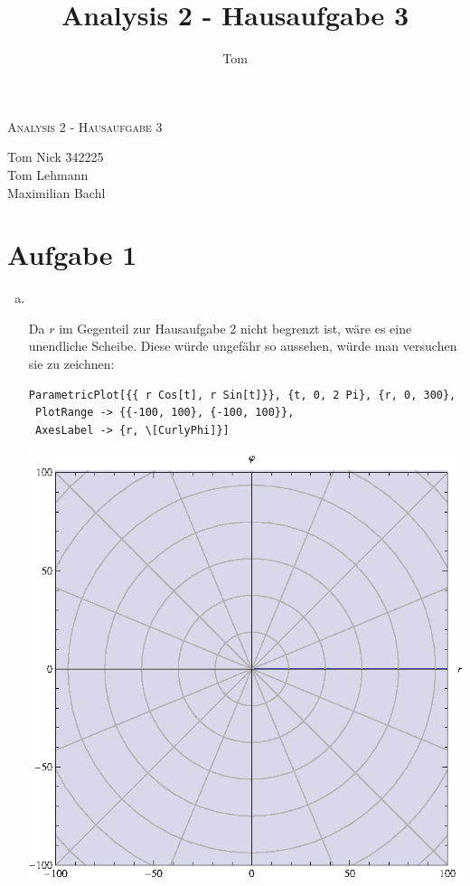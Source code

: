 \documentclass[10pt,a4paper,parskip=half]{scrartcl}
\author{Tom}
\title{Analysis 2 - Hausaufgabe 3}
\begin{document}
\begin{center}
\textsc{\Large{Analysis 2 - Hausaufgabe 3}} \\
\end{center}
\begin{tabbing}
Tom Nick \hspace{1.4cm}\= 342225\\
Tom Lehmann\\
Maximilian Bachl
\end{tabbing}
\section*{Aufgabe 1}
\begin{enumerate}[(a)]
\item \ \\
\begin{minipage}{0.50\columnwidth}
Da $r$ im Gegenteil zur Hausaufgabe 2 nicht begrenzt ist, wäre es eine unendliche Scheibe. Diese würde ungefähr so aussehen, würde man versuchen sie zu zeichnen:
\begin{lstlisting}[caption= Mathematica Code für den Graph von h]
ParametricPlot[{{ r Cos[t], r Sin[t]}}, {t, 0, 2 Pi}, {r, 0, 300}, 
 PlotRange -> {{-100, 100}, {-100, 100}}, 
 AxesLabel -> {r, \[CurlyPhi]}]
\end{lstlisting}
\end{minipage}
\begin{minipage}{0.49\columnwidth}
\begin{center}
\includegraphics[scale=0.7]{1i.eps} 

\end{center}
\end{minipage}
\end{enumerate}
\end{document}
